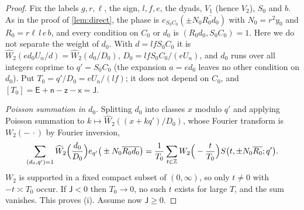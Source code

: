 \documentclass[11pt,colorlinks]{charlie}
\begin{document}
\begin{proof}
Fix the labels $g,r,\ell$, the sign, $l,f,e$, the dyads, $V_1$ (hence $V_2$), $S_0$ and $b$. As in the proof of \cref{lem:direct}, the phase is $e_{S_0C_0}(\pm N_0\overline{R_0d_0})$ with $N_0=r^2y_0$ and $R_0=r\ell\,l\,e\,b$, and every condition on $C_0$ or $d_0$ is $(R_0d_0,S_0C_0)=1$. Here we do not separate the weight of $d_0$. With $d=lfS_0C_0$ it is $\widehat W_2(ed_0U_n/d)=\widehat W_2(d_0/D_0)$, $D_0=lfS_0C_0/(eU_n)$, and $d_0$ runs over all integers coprime to $q'=S_0C_0$ (the expansion $a=ed_0$ leaves no other condition on $d_0$). Put $T_0=q'/D_0=eU_n/(lf)$; it does not depend on $C_0$, and $[T_0]=\mathsf E+\mathsf n-\mathsf z-\mathsf x=\mathsf J$.

\emph{Poisson summation in $d_0$.} Splitting $d_0$ into classes $x$ modulo $q'$ and applying Poisson summation to $k\mapsto\widehat W_2((x+kq')/D_0)$, whose Fourier transform is $W_2(-\,\cdot)$ by Fourier inversion,
\[
 \sum_{(d_0,q')=1}\widehat W_2\Big(\frac{d_0}{D_0}\Big)e_{q'}\big(\pm N_0\overline{R_0d_0}\big)=\frac1{T_0}\sum_{t\in\mathbb{Z}}W_2\Big(-\frac t{T_0}\Big)S\big(t,\pm N_0\overline{R_0};q'\big).
\]
$W_2$ is supported in a fixed compact subset of $(0,\infty)$, so only $t\ne0$ with $-t\asymp T_0$ occur. If $\mathsf J<0$ then $T_0\to0$, no such $t$ exists for large $T$, and the sum vanishes. This proves (i). Assume now $\mathsf J\ge0$.


\end{proof}
\end{document}
